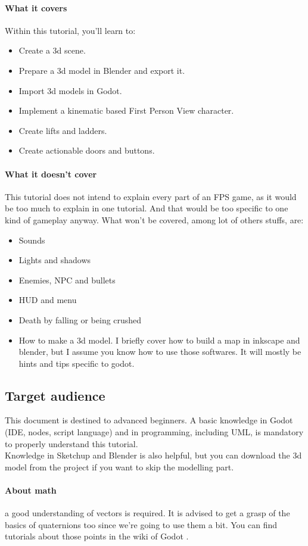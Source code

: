 \documentclass[10pt,a4paper]{article}
\begin{document}
\paragraph{What it covers} 
Within this tutorial, you'll learn to:
\begin{itemize}
\item Create a 3d scene.
\item Prepare a 3d model in Blender and export it.
\item Import 3d models in Godot.
\item Implement a kinematic based First Person View character.
\item Create lifts and ladders.
\item Create actionable doors and buttons.
\end{itemize}

\paragraph{What it doesn't cover}
This tutorial does not intend to explain every part of an FPS game, as it would be too much to explain in one tutorial. And that would be too specific to one kind of gameplay anyway. What won't be covered, among lot of others stuffs, are:
\begin{itemize}
\item Sounds
\item Lights and shadows
\item Enemies, NPC and bullets
\item HUD and menu
\item Death by falling or being crushed
\item How to make a 3d model. I briefly cover how to build a map in inkscape and blender, but I assume you know how to use those softwares. It will mostly be hints and tips specific to godot.
\end{itemize}

\subsection{Target audience}
This document is destined to advanced beginners. A basic knowledge in Godot (IDE, nodes, script language) and in programming, including UML, is mandatory to properly understand this tutorial. \\
Knowledge in Sketchup and Blender is also helpful, but you can download the 3d model from the project\cite{github_project} if you want to skip the modelling part.
\paragraph{About math} a good understanding of vectors is required. It is advised to get a grasp of the basics of quaternions too since we're going to use them a bit. You can find tutorials about those points in the wiki of Godot \cite{wiki_godot}.
\end{document}
